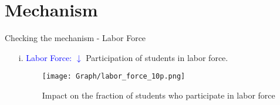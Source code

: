 \documentclass[9pt]{beamer}
\begin{document}
\section{Mechanism}
\begin{frame}{Checking the mechanism - Labor Force}
            \begin{itemize}  
            \item[i. ] \textcolor{blue}{Labor Force:} \textcolor{blue}{$\downarrow$}  Participation of students in labor force.
            \begin{center} 
     \begin{figure}[H]
         \centering
         \texttt{[image: Graph/labor\_force\_10p.png]}
         \caption{Impact on the fraction of students who participate in labor force }
         \label{fig:labor_force_10p}
     \end{figure}
\end{center}  
        \end{itemize} \\~\\
\end{frame}
\end{document}
